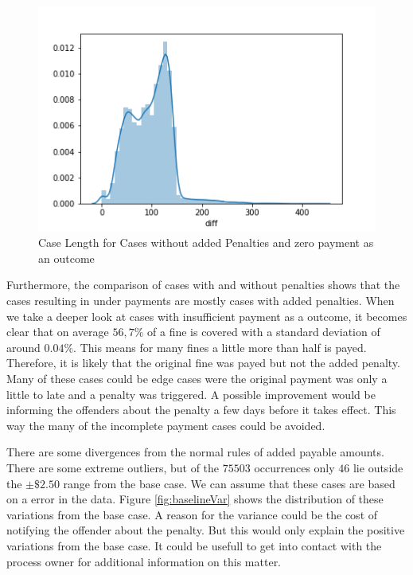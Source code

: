 \documentclass[12pt]{report}
\begin{document}
\begin{figure}[H]
  \centering
  \includegraphics[width=\textwidth]{figures/no_penalty_send_fine.png}
  \caption{Case Length for Cases without added Penalties and zero payment as an outcome}
  \label{fig:send_fine_len}
\end{figure}

Furthermore, the comparison of cases with and without penalties shows that the cases resulting in under payments are mostly cases with added penalties. When we take a deeper look at cases with insufficient payment as a outcome, it becomes clear that on average $ 56,7 \% $ of a fine is covered with a standard deviation of around $ 0.04 \% $. This means for many fines a little more than half is payed. Therefore, it is likely that the original fine was payed but not the added penalty. Many of these cases could be edge cases were the original payment was only a little to late and a penalty was triggered. A possible improvement would be informing the offenders about the penalty a few days before it takes effect. This way the many of the incomplete payment cases could be avoided.

There are some divergences from the normal rules of added payable amounts. There are some extreme outliers, but of the $75503$ occurrences only $46$ lie outside the $ \pm \$2.50 $ range from the base case. We can assume that these cases are based on a error in the data. Figure \ref{fig:baselineVar} shows the distribution of these variations from the base case. A reason for the variance could be the cost of notifying the offender about the penalty. But this would only explain the positive variations from the base case. It could be usefull to get into contact with the process owner for additional information on this matter. 
\end{document}
